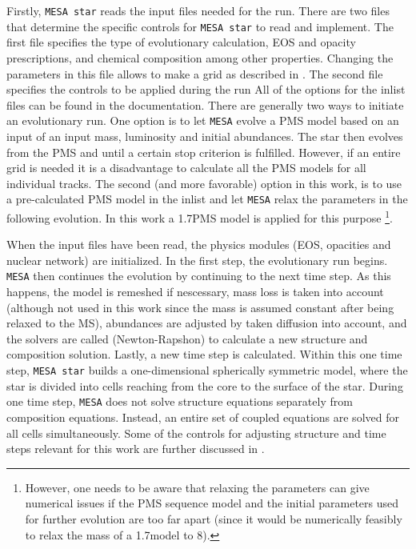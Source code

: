 Firstly, \texttt{MESA star} reads the input files needed for the run. There are two files that determine the specific controls for \texttt{MESA star} to read and implement. The first file specifies the type of evolutionary calculation, EOS and opacity prescriptions, and chemical composition among other properties. Changing the parameters in this file allows to make a grid as described in . The second file specifies the controls to be applied during the run
All of the options for the inlist files can be found in the documentation. There are generally two ways to initiate an evolutionary run. One option is to let \texttt{MESA} evolve a PMS model based on an input of an input mass, luminosity and initial abundances. The star then evolves from the PMS and until a certain stop criterion is fulfilled. However, if an entire grid is needed it is a disadvantage to calculate all the PMS models for all individual tracks. The second (and more favorable) option in this work, is to use a pre-calculated PMS model in the inlist and let \texttt{MESA} relax the parameters in the following evolution. In this work a 1.7\msun PMS model is applied for this purpose \footnote{However, one needs to be aware that relaxing the parameters can give numerical issues if the PMS sequence model and the initial parameters used for further evolution are too far apart (since it would be numerically feasibly to relax the mass of a 1.7\msun model to 8\msun).}. %

When the input files have been read, the physics modules (EOS, opacities and nuclear network) are initialized. In the first step, the evolutionary run begins. \texttt{MESA} then continues the evolution by continuing to the next time step. As this happens, the model is remeshed if nescessary, mass loss is taken into account (although not used in this work since the mass is assumed constant after being relaxed to the MS), abundances are adjusted by taken diffusion into account, and the solvers are called (Newton-Rapshon) to calculate a new structure and composition solution. Lastly, a new time step is calculated. Within this one time step, \texttt{MESA star} builds a one-dimensional spherically symmetric model, where the star is divided into cells reaching from the core to the surface of the star. During one time step, \texttt{MESA} does not solve structure equations separately from composition equations. Instead, an entire set of coupled equations are solved for all cells simultaneously. Some of the controls for adjusting structure and time steps relevant for this work are further discussed in .

